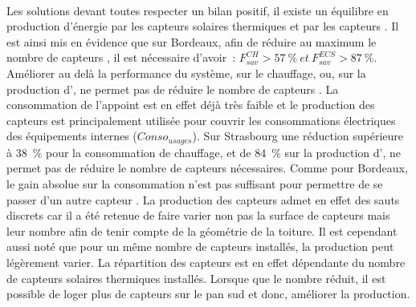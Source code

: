 \paragraph{} %
Les solutions devant toutes respecter un bilan positif, il existe un équilibre en
production d’énergie par les capteurs solaires thermiques et par les capteurs .
Il est ainsi mis en évidence que sur Bordeaux, afin de réduire au maximum le nombre
de capteurs , il est nécessaire d’avoir~:
$F_{sav}^{CH} > \SI{57}{\percent} \ et \ F_{sav}^{ECS} > \SI{87}{\percent}$.
Améliorer au delà la performance du système, sur le chauffage, ou, sur la production
d’, ne permet pas de réduire le nombre de capteurs . La consommation de
l’appoint est en effet déjà très faible et le production des capteurs  est
principalement utilisée pour couvrir les consommations électriques des équipements
internes ($Conso_{usages}$). Sur Strasbourg une réduction supérieure à \SI{38}{\percent}
pour la consommation de chauffage, et de \SI{84}{\percent} sur la production d’,
ne permet pas de réduire le nombre de capteurs  nécessaires. Comme pour Bordeaux,
le gain absolue sur la consommation n’est pas suffisant pour permettre de se passer d’un
autre capteur . La production des capteurs  admet en effet des sauts
discrets car il a été retenue de faire varier non pas la surface de capteurs mais leur
nombre afin de tenir compte de la géométrie de la toiture. Il est cependant aussi noté que
pour un même nombre de capteurs installés, la production peut légèrement varier. La
répartition des capteurs  est en effet dépendante du nombre de capteurs solaires
thermiques installés. Lorsque que le nombre réduit, il est possible de loger plus de
capteurs  sur le pan sud et donc, améliorer la production.

